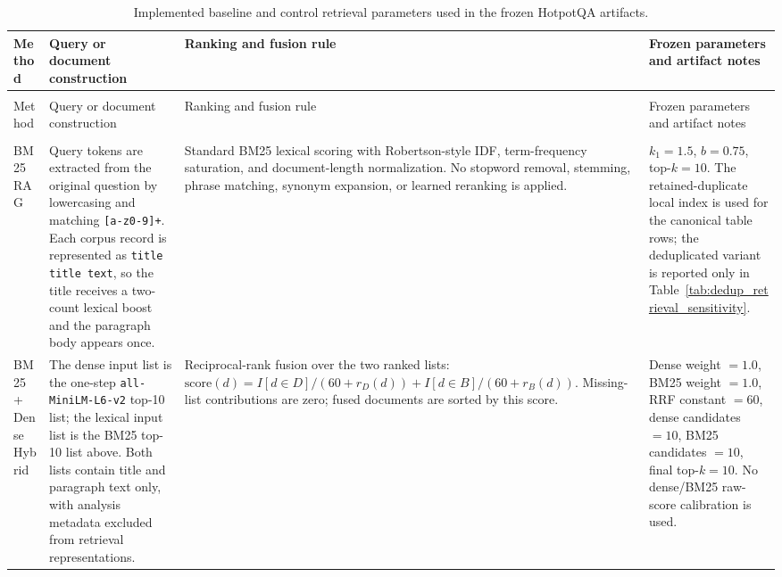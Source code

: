 \begingroup
\footnotesize
\setlength{\tabcolsep}{3pt}
\begin{longtable}{>{\raggedright\arraybackslash}p{}
                            >{\raggedright\arraybackslash}p{}
                            >{\raggedright\arraybackslash}p{}
                            >{\raggedright\arraybackslash}p{}}
\caption{Implemented baseline and control retrieval parameters used in the frozen HotpotQA artifacts.}
\label{tab:baseline_implementation_parameters}\\
\toprule
Method & Query or document construction & Ranking and fusion rule & Frozen parameters and artifact notes \\
\midrule
\endfirsthead
\multicolumn{4}{l}{\footnotesize\itshape Table~\thetable\ continued}\\
\toprule
Method & Query or document construction & Ranking and fusion rule & Frozen parameters and artifact notes \\
\midrule
\endhead
\midrule
\multicolumn{4}{r}{\footnotesize Continued on next page}\\
\endfoot
\bottomrule
\endlastfoot
BM25 RAG & Query tokens are extracted from the original question by lowercasing and matching \texttt{[a-z0-9]+}. Each corpus record is represented as \texttt{title title text}, so the title receives a two-count lexical boost and the paragraph body appears once. & Standard BM25 lexical scoring with Robertson-style IDF, term-frequency saturation, and document-length normalization. No stopword removal, stemming, phrase matching, synonym expansion, or learned reranking is applied. & $k_1=1.5$, $b=0.75$, top-$k=10$. The retained-duplicate local index is used for the canonical table rows; the deduplicated variant is reported only in Table~\ref{tab:dedup_retrieval_sensitivity}. \\
BM25 + Dense Hybrid & The dense input list is the one-step \texttt{all-MiniLM-L6-v2} top-10 list; the lexical input list is the BM25 top-10 list above. Both lists contain title and paragraph text only, with analysis metadata excluded from retrieval representations. & Reciprocal-rank fusion over the two ranked lists: $\mathrm{score}(d)=I[d\in D]/(60+r_D(d))+I[d\in B]/(60+r_B(d))$. Missing-list contributions are zero; fused documents are sorted by this score. & Dense weight $=1.0$, BM25 weight $=1.0$, RRF constant $=60$, dense candidates $=10$, BM25 candidates $=10$, final top-$k=10$. No dense/BM25 raw-score calibration is used. \\

\end{longtable}
